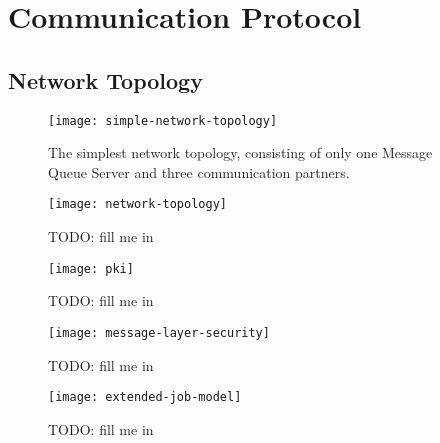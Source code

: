 \chapter{Communication Protocol}
\label{cha:comm-prot}

\section{Network Topology}
\label{sec:network-topology}

\begin{figure}
  \begin{center}
    \texttt{[image: simple-network-topology]}
  \end{center}
  \caption[Network  Topology   (simple)]{The  simplest  network  topology,
    consisting of  only one Message  Queue Server and  three communication
    partners.}
  \label{fig:simple-net-top}
\end{figure}

\begin{figure}
  \begin{center}
    \texttt{[image: network-topology]}
  \end{center}
  \caption[Network  Topology]{TODO: fill me in}
  \label{fig:net-top}
\end{figure}

\begin{figure}
  \begin{center}
    \texttt{[image: pki]}
  \end{center}
  \caption[Public Key Infrastructure]{TODO: fill me in}
  \label{fig:net-pki}
\end{figure}

\begin{figure}
  \begin{center}
    \texttt{[image: message-layer-security]}
  \end{center}
  \caption[Message Layer Security]{TODO: fill me in}
  \label{fig:net-mls}
\end{figure}

\begin{figure}
  \begin{center}
    \texttt{[image: extended-job-model]}
  \end{center}
  \caption[Job Model (extended)]{TODO: fill me in}
  \label{fig:bes-extended-xen}
\end{figure}

